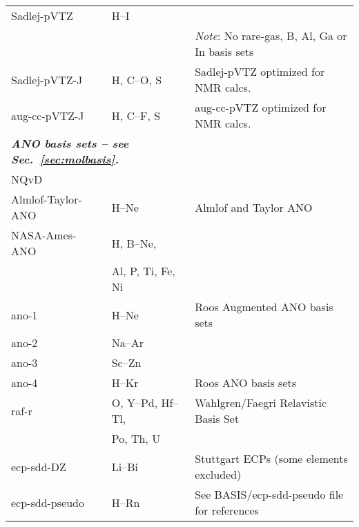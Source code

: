 \begin{longtable}{lll}
Sadlej-pVTZ & H--I & \cite{ajstca79,ajsmujmst234,ajstca81,ajstca81-2} \\
  &  & \emph{Note}: No rare-gas, B, Al, Ga or In basis sets\\
%
Sadlej-pVTZ-J & H, C--O, S & \cite{pfpgaaspasjcp115} Sadlej-pVTZ optimized for NMR calcs.\\
aug-cc-pVTZ-J & H, C--F, S & \cite{pfpgaaspasjcp115} aug-cc-pVTZ optimized for NMR calcs. \\
\hline
\multicolumn{2}{l}{\bf{\emph{ANO basis sets\index{basis!ANO} -- see Sec.~\ref{sec:molbasis}.}}} & \\
NQvD & & \cite{nqvdref} \\
Almlof-Taylor-ANO & H--Ne & \cite{japrtjcp86} Almlof and Taylor ANO \\
NASA-Ames-ANO & H, B--Ne, & \cite{japrtjcp86,cwbsrlaktca77} \\
  & Al, P, Ti, Fe, Ni & \\
ano-1 & H--Ne & \cite{powpambortca77} Roos Augmented ANO basis sets\\
ano-2 & Na--Ar & \cite{powbjpbortca79} \\
ano-3 & Sc--Zn & \cite{rpamminpowbortca92} \\
ano-4 & H--Kr & \cite{kpbdpowbortca90} Roos ANO basis sets\\
\hline
raf-r & O, Y--Pd, Hf--Tl, & Wahlgren/Faegri Relavistic Basis Set\\
 & Po, Th, U & \\
ecp-sdd-DZ & Li--Bi & Stuttgart ECPs (some elements excluded) \\
ecp-sdd-pseudo & H--Rn &  See BASIS/ecp-sdd-pseudo file for references \\
\hline
\end{longtable}



